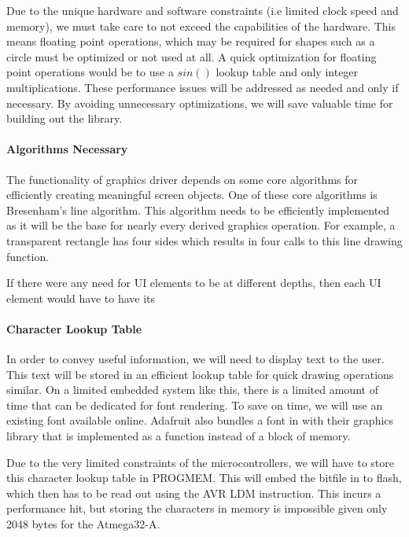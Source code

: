 Due to the unique hardware and software constraints (i.e limited clock speed
and memory), we must take care to not exceed the capabilities of the hardware.
This means floating point operations, which may be required for shapes such as
a circle must be optimized or not used at all. A quick optimization for
floating point operations would be to use a $sin()$ lookup table and only
integer multiplications. These performance issues will be addressed as needed
and only if necessary. By avoiding unnecessary optimizations, we will save
valuable time for building out the library.

\paragraph{Algorithms Necessary}
The functionality of graphics driver depends on some core algorithms for
efficiently creating meaningful screen objects. One of these core algorithms is
Bresenham's
line algorithm.\cite{link26} This algorithm needs to be efficiently implemented as it will
be the base for nearly every derived graphics operation. For example, a
transparent rectangle has four sides which results in four calls to this line
drawing function.

If there were any need for UI elements to be at different depths, then each UI
element would have to have its

\paragraph{Character Lookup Table}
In order to convey useful information, we will need to display text to the
user. This text will be stored in an efficient lookup table for quick drawing
operations similar. On a limited embedded
system like this, there is a limited amount of time that can be dedicated for
font rendering. To save on time, we will use an existing font available online.
Adafruit also bundles a font in with their graphics library that is implemented
as a function instead of a block of memory.

Due to the very limited constraints of the microcontrollers, we will have to
store this character lookup table in PROGMEM. This will embed the bitfile in to
flash, which then has to be read out using the AVR LDM instruction. This incurs
a performance hit, but storing the characters in memory is impossible given
only 2048 bytes for the Atmega32-A.

